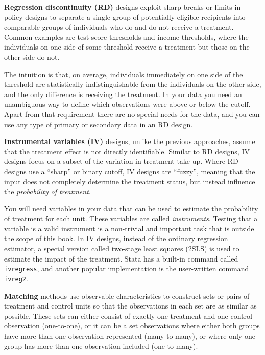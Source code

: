
\textbf{Regression discontinuity (RD)}
designs exploit sharp breaks or limits
in policy designs to separate a single group of potentially eligible recipients
into comparable groups of individuals who do and do not receive a treatment.
Common examples are test score thresholds and income thresholds,
where the individuals on one side of some threshold receive
a treatment but those on the other side do not.

The intuition is that, on average,
individuals immediately on one side of the threshold
are statistically indistinguishable from the individuals on the other side,
and the only difference is receiving the treatment.
In your data you need an unambiguous way
to define which observations were above or below the cutoff.
Apart from that requirement there are no special needs for the data,
and you can use any type of primary or secondary data in an RD design.


\textbf{Instrumental variables (IV)}
designs, unlike the previous approaches,
assume that the treatment effect is not directly identifiable.
Similar to RD designs,
IV designs focus on a subset of the variation in treatment take-up.
Where RD designs use a ``sharp'' or binary cutoff,
IV designs are ``fuzzy'', meaning that the input does not completely determine
the treatment status, but instead influence the \textit{probability of treatment}.

You will need variables in your data
that can be used to estimate the probability of treatment for each unit.
These variables are called \textit{instruments}.
Testing that a variable is a valid instrument is a non-trivial and important task
that is outside the scope of this book.
In IV designs, instead of the ordinary regression estimator,
a special version called two-stage least squares (2SLS) is used
to estimate the impact of the treatment.
Stata has a built-in command called \texttt{ivregress},
and another popular implementation is the user-written command \texttt{ivreg2}.


\textbf{Matching}
methods use observable characteristics to construct
sets or pairs of treatment and control units
so that the observations in each set are as similar as possible. 
These sets can either consist of exactly one treatment and one control observation (one-to-one),
or it can be a set observations where either
both groups have more than one observation represented (many-to-many),
or where only one group has more than one observation included (one-to-many).

